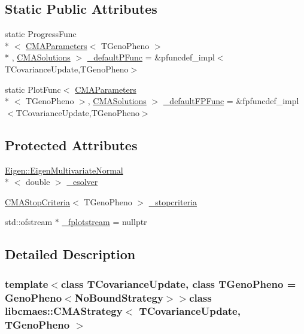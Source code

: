 \subsection*{Static Public Attributes}
\begin{DoxyCompactItemize}
\item 
static Progress\+Func\\*
$<$ \hyperlink{classlibcmaes_1_1CMAParameters}{C\+M\+A\+Parameters}$<$ T\+Geno\+Pheno $>$\\*
, \hyperlink{classlibcmaes_1_1CMASolutions}{C\+M\+A\+Solutions} $>$ \hyperlink{classlibcmaes_1_1CMAStrategy_af6d980c670eef47ee810645739999d5b}{\+\_\+default\+P\+Func} = \&pfuncdef\+\_\+impl$<$T\+Covariance\+Update,T\+Geno\+Pheno$>$
\item 
static Plot\+Func$<$ \hyperlink{classlibcmaes_1_1CMAParameters}{C\+M\+A\+Parameters}\\*
$<$ T\+Geno\+Pheno $>$, \hyperlink{classlibcmaes_1_1CMASolutions}{C\+M\+A\+Solutions} $>$ \hyperlink{classlibcmaes_1_1CMAStrategy_a0fcdccd9451a2dc509ee651f664ac31f}{\+\_\+default\+F\+P\+Func} = \&fpfuncdef\+\_\+impl$<$T\+Covariance\+Update,T\+Geno\+Pheno$>$
\end{DoxyCompactItemize}
\subsection*{Protected Attributes}
\begin{DoxyCompactItemize}
\item 
\hyperlink{classEigen_1_1EigenMultivariateNormal}{Eigen\+::\+Eigen\+Multivariate\+Normal}\\*
$<$ double $>$ \hyperlink{classlibcmaes_1_1CMAStrategy_ad9d6fe34da1fb94315e86625210fe009}{\+\_\+esolver}
\item 
\hyperlink{classlibcmaes_1_1CMAStopCriteria}{C\+M\+A\+Stop\+Criteria}$<$ T\+Geno\+Pheno $>$ \hyperlink{classlibcmaes_1_1CMAStrategy_af7b7c6bf3018f5e3d57f2875215bba0c}{\+\_\+stopcriteria}
\item 
std\+::ofstream $\ast$ \hyperlink{classlibcmaes_1_1CMAStrategy_ad05db57e25a5aa2d4abe9cb030406236}{\+\_\+fplotstream} = nullptr
\end{DoxyCompactItemize}


\subsection{Detailed Description}
\subsubsection*{template$<$class T\+Covariance\+Update, class T\+Geno\+Pheno = Geno\+Pheno$<$\+No\+Bound\+Strategy$>$$>$class libcmaes\+::\+C\+M\+A\+Strategy$<$ T\+Covariance\+Update, T\+Geno\+Pheno $>$}

